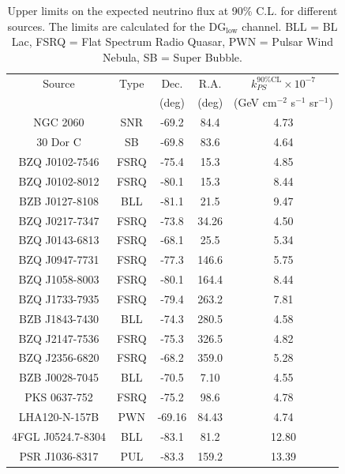 \begin{table}
  \centering
  \begin{tabular}{|c|c|c|c|c|}
    \hline
    Source & Type & Dec. & R.A. & $k^{\text{90\%CL}}_{PS} \times 10^{-7}$ \\
    & & (deg) & (deg) & (GeV cm$^{-2}$ s$^{-1}$ sr$^{-1}$) \\
    \hline
    NGC 2060 & SNR & -69.2 & 84.4 & 4.73 \\
    30 Dor C & SB & -69.8 & 83.6 & 4.64 \\
    BZQ J0102-7546 & FSRQ & -75.4 & 15.3 & 4.85 \\
    BZQ J0102-8012 & FSRQ &-80.1 & 15.3 & 8.44  \\
    BZB J0127-8108 & BLL & -81.1 & 21.5 & 9.47 \\
    BZQ J0217-7347 & FSRQ &-73.8 & 34.26 & 4.50 \\
    BZQ J0143-6813 & FSRQ &-68.1 & 25.5 & 5.34 \\
    BZQ J0947-7731 & FSRQ &-77.3 & 146.6 & 5.75 \\
    BZQ J1058-8003 & FSRQ & -80.1 & 164.4 & 8.44 \\
    BZQ J1733-7935 & FSRQ &-79.4 & 263.2 & 7.81 \\
    BZB J1843-7430 & BLL& -74.3 & 280.5 & 4.58 \\
    BZQ J2147-7536 & FSRQ &-75.3 & 326.5 & 4.82 \\
    BZQ J2356-6820 & FSRQ&-68.2 & 359.0 & 5.28 \\
    BZB J0028-7045 & BLL&-70.5 & 7.10 & 4.55 \\
    PKS 0637-752 & FSRQ &-75.2 & 98.6 & 4.78 \\
    LHA120-N-157B & PWN & -69.16 & 84.43 & 4.74 \\
    4FGL J0524.7-8304 & BLL & -83.1 & 81.2 & 12.80 \\
    PSR J1036-8317 & PUL & -83.3 & 159.2 & 13.39 \\
    \hline
  \end{tabular}
  \caption{Upper limits on the expected neutrino flux at 90\% C.L. for different sources. The limits are calculated for the DG$_{\text{low}}$ channel. BLL = BL Lac, FSRQ = Flat Spectrum Radio Quasar, PWN = Pulsar Wind Nebula, SB = Super Bubble.}
  \label{tab:source_limits}
\end{table}
 
